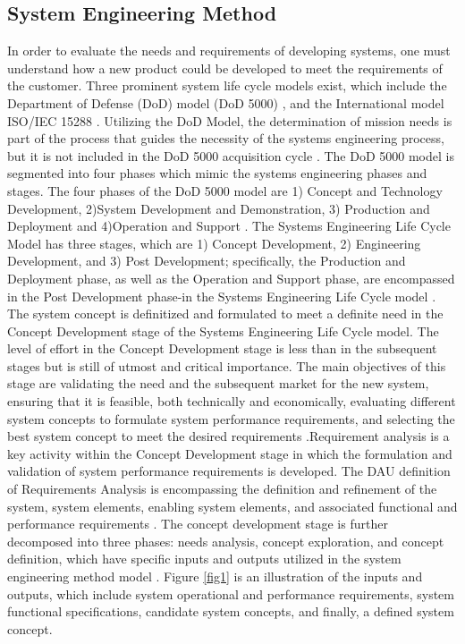 \documentclass[num-refs]{wiley-article}
\begin{document}
\subsection{System Engineering Method}
\label{System Engineering Method}

In order to evaluate the needs and requirements of developing systems, one must understand how a new product {could be} developed to meet the requirements of the customer. Three prominent system life cycle models exist, which include the Department of Defense (DoD) model (DoD 5000) \cite{StarnellPeter1991}, and the International model ISO/IEC 15288 \cite{Ieee15288_2015}. Utilizing the DoD Model, the determination of mission needs is part of the process that guides the necessity of the systems engineering process, but it is not included in the DoD 5000 acquisition cycle \cite{StarnellPeter1991}. The DoD 5000 model is segmented into four phases which mimic the systems engineering phases and stages. The four phases of the DoD 5000 model are 1) Concept and Technology Development, 2)System Development and Demonstration, 3) Production and Deployment and 4)Operation and Support \cite{StarnellPeter1991}. The Systems Engineering Life Cycle Model has three stages, which are 1) Concept Development, 2) Engineering Development, and 3) Post Development; specifically, the Production and Deployment phase, as well as the Operation and Support phase, are encompassed in the Post Development phase-in the Systems Engineering Life Cycle model \cite{Kossiakoff2011}.
The system concept is definitized and formulated to meet a definite need in the Concept Development stage of the Systems Engineering Life Cycle model. The level of effort in the Concept Development stage is less than in the subsequent stages but is still of utmost and critical importance. The main objectives of this stage are validating the need and the subsequent market for the new system, ensuring that it is feasible, both technically and economically, evaluating different system concepts to formulate system performance requirements, and selecting the best system concept to meet the desired requirements \cite{Claxton2005}.Requirement analysis is a key activity within the Concept Development stage in which the formulation and validation of system performance requirements is developed. The DAU definition of Requirements Analysis is encompassing the definition and refinement of the system, system elements, enabling system elements, and associated functional and performance requirements \cite{Pesler2011}. The concept development stage is further decomposed into three phases: needs analysis, concept exploration, and concept definition, which have specific inputs and outputs utilized in the system engineering method model \cite{Kossiakoff2011}. Figure \ref{fig1} is an illustration of the inputs and {outputs, which }include system operational and performance requirements, system functional specifications, candidate system concepts, and finally, a defined system concept.
\end{document}
